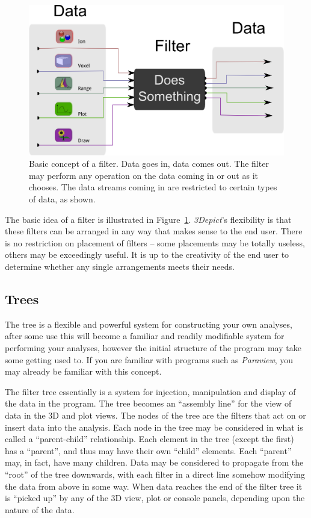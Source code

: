 \documentclass[10pt]{article}
\begin{document}
\begin{figure}[htp]
 \centering
 \includegraphics[keepaspectratio=true,width=0.85 \textwidth]{./figures/generic-filter.png}
 \caption{Basic concept of a filter. Data goes in, data comes out. The filter may perform any operation on the data coming in or out as it chooses. The data streams coming in are restricted to certain types of data, as shown. }
\label{fig:basic-filter}
\end{figure}


The basic idea of a filter is illustrated in Figure~\ref{fig:basic-filter}. \emph{3Depict}'s flexibility is that these filters can be arranged in any way that makes sense to the end user. There is no restriction on placement of filters -- some placements may be totally useless, others may be exceedingly useful. It is up to the creativity of the end user to determine whether any single arrangements meets their needs.

\subsection{Trees}
\label{sec:treebehaviour}
The tree is a flexible and powerful system for constructing your own analyses, after some use this will become a familiar and readily modifiable system for performing your analyses, however the initial structure of the program may take some getting used to. If you are familiar with programs such as \emph{Paraview}, you may already be familiar with this concept.  

The filter tree essentially is a system for injection, manipulation and display of the data in the program. The tree becomes an ``assembly line'' for the view of data in the 3D and plot views.  The nodes of the tree are the filters that act on or insert data into the analysis. Each node in the tree may be considered in what is called a ``parent-child'' relationship. Each element in the tree (except the first) has a ``parent'', and thus may have their own ``child'' elements. Each ``parent'' may, in fact, have many children. Data may be considered to propagate from the ``root'' of the tree downwards, with each filter in a direct line somehow modifying the data from above in some way. When data reaches the end of the filter tree it is ``picked up'' by any of the 3D view, plot or console panels, depending upon the nature of the data. 	
\end{document}

